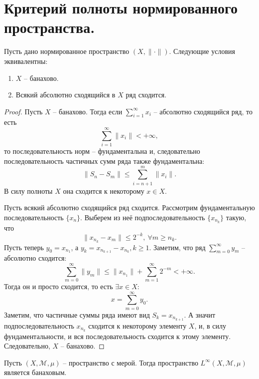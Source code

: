 \section{Критерий полноты нормированного пространства.}
\begin{theorem}
    Пусть дано нормированное пространство $(X, \|\cdot\|)$.
    Следующие условия эквивалентны:
    \begin{enumerate}
        \item $X$ -- банахово.
        \item Всякий абсолютно сходящийся в $X$ ряд сходится.
    \end{enumerate}
\end{theorem}
\begin{proof}
    Пусть $X$ -- банахово.
    Тогда если $\sum_{i = 1}^{\infty} x_i$ -- абсолютно сходящийся ряд, то есть
    \[
        \sum_{i = 1}^{\infty} \|x_i\| < +\infty,
    \]
    то последовательность норм -- фундаментальна и, следовательно последовательность частичных сумм ряда также фундаментальна:
    \[
        \|S_n - S_m\| \leq \sum_{i = n + 1}^{m} \|x_i\|.
    \]
    В силу полноты $X$ она сходится к некоторому $x \in X$.

    Пусть всякий абсолютно сходящийся ряд сходится.
    Рассмотрим фундаментальную последовательность $\{x_n\}$.
    Выберем из неё подпоследовательность $\{x_{n_k}\}$ такую, что
    \[
        \|x_{n_k} - x_m\| \leq 2^{-k}, \ \forall m \geq n_k.
    \]
    Пусть теперь $y_0 = x_{n_1}$, а $y_k = x_{n_{k + 1}} - x_{n_k}, k \geq 1$.
    Заметим, что ряд $\sum_{m = 0}^{\infty} y_m$ -- абсолютно сходится:
    \[
        \sum_{m = 0}^{\infty} \|y_m\| \leq \|x_{n_1}\| + \sum_{m = 1}^{\infty} 2^{-m} < +\infty.
    \]
    Тогда он и просто сходится, то есть $\exists x \in X\colon$
    \[
        x = \sum_{m = 0}^{\infty} y_0.
    \]
    Заметим, что частичные суммы ряда имеют вид $S_k = x_{n_{k + 1}}$.
    А значит подпоследовательность $x_{n_k}$ сходится к некоторому элементу $X$, и, в силу фундаментальности, и вся последовательность сходится к этому элементу.
    Следовательно, $X$ -- банахово.
\end{proof}
\begin{theorem}
    Пусть $(X, \mathcal{M}, \mu)$ -- пространство с мерой.
    Тогда пространство $L^\infty(X, \mathcal{M}, \mu)$ является банаховым.
\end{theorem}
